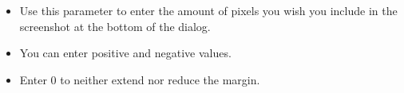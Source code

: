 
\begin{itemize}
\item Use this parameter to enter the amount of pixels you wish you include in the screenshot at the bottom of the dialog. 
\item You can enter positive and negative values. 
\item Enter 0 to neither extend nor reduce the margin. 
\end{itemize}
